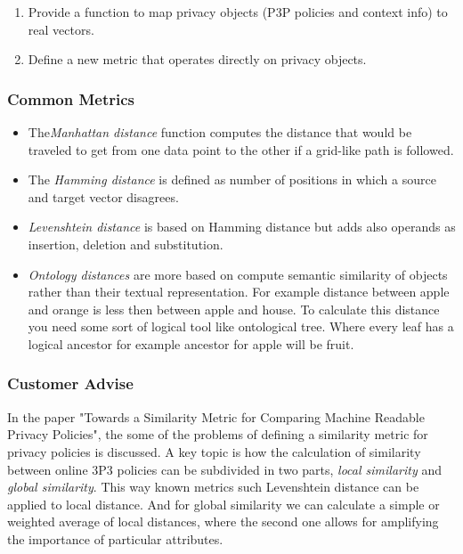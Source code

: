 \begin{enumerate}
\item Provide a function to map privacy objects (P3P policies and context info) to real vectors.
\item Define a new metric that operates directly on privacy objects.
\end{enumerate}
 

\subsubsection{Common Metrics}

\begin{itemize}
\item The\emph{Manhattan distance} function computes the distance that would be traveled to get from one data point to the other if a grid-like path is followed. 
\item The \emph{Hamming distance} is defined as number of positions in which a source and target vector disagrees.  
\item \emph{Levenshtein distance} is based on Hamming distance but adds also operands as insertion, deletion and substitution.  
\item \emph{Ontology distances} are more based on compute semantic similarity of objects rather than their textual representation. For example distance between apple and orange is less then between apple and house. To calculate this distance you need some sort of logical tool like ontological tree. Where every leaf has a logical ancestor for example ancestor for apple will be fruit.
\end{itemize}
\subsubsection{Customer Advise}

In the paper "Towards a Similarity Metric for Comparing Machine Readable Privacy Policies", the some of the problems of defining a similarity metric for privacy policies is discussed. A key topic is how the calculation of similarity between online 3P3 policies can be subdivided in two parts, \emph{local similarity} and \emph{global similarity}. This way known metrics such Levenshtein distance  can be applied to local distance. And for global similarity we can calculate a simple or weighted average of local distances, where the second one allows for amplifying the importance of particular attributes.

